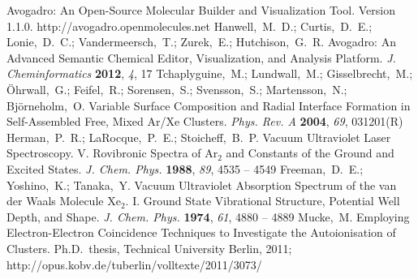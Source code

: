 \documentclass[journal=jpccck,manuscript=article]{achemso}
\begin{document}
\begin{mcitethebibliography}{73}
Avogadro: An Open-Source Molecular Builder and Visualization Tool. Version
  1.1.0. http://avogadro.openmolecules.net\relax
\mciteBstWouldAddEndPuncttrue
\mciteSetBstMidEndSepPunct{\mcitedefaultmidpunct}
{\mcitedefaultendpunct}{\mcitedefaultseppunct}\relax
\EndOfBibitem
{}
Hanwell,~M.~D.; Curtis,~D.~E.; Lonie,~D.~C.; Vandermeersch,~T.; Zurek,~E.;
  Hutchison,~G.~R. Avogadro: An Advanced Semantic Chemical Editor,
  Visualization, and Analysis Platform. \emph{J. Cheminformatics}
  \textbf{2012}, \emph{4}, 17\relax
\mciteBstWouldAddEndPuncttrue
\mciteSetBstMidEndSepPunct{\mcitedefaultmidpunct}
{\mcitedefaultendpunct}{\mcitedefaultseppunct}\relax
\EndOfBibitem
{}
Tchaplyguine,~M.; Lundwall,~M.; Gisselbrecht,~M.; \"Ohrwall,~G.; Feifel,~R.;
  Sorensen,~S.; Svensson,~S.; Martensson,~N.; Bj\"orneholm,~O. Variable Surface
  Composition and Radial Interface Formation in Self-Assembled Free, Mixed
  Ar/Xe Clusters. \emph{Phys. Rev. A} \textbf{2004}, \emph{69}, 031201(R)\relax
\mciteBstWouldAddEndPuncttrue
\mciteSetBstMidEndSepPunct{\mcitedefaultmidpunct}
{\mcitedefaultendpunct}{\mcitedefaultseppunct}\relax
\EndOfBibitem
{}
Herman,~P.~R.; LaRocque,~P.~E.; Stoicheff,~B.~P. Vacuum Ultraviolet Laser
  Spectroscopy. V. Rovibronic Spectra of Ar$_2$ and Constants of the Ground and
  Excited States. \emph{J. Chem. Phys.} \textbf{1988}, \emph{89}, 4535 --
  4549\relax
\mciteBstWouldAddEndPuncttrue
\mciteSetBstMidEndSepPunct{\mcitedefaultmidpunct}
{\mcitedefaultendpunct}{\mcitedefaultseppunct}\relax
\EndOfBibitem
{}
Freeman,~D.~E.; Yoshino,~K.; Tanaka,~Y. Vacuum Ultraviolet Absorption Spectrum
  of the van der Waals Molecule Xe$_2$. I. Ground State Vibrational Structure,
  Potential Well Depth, and Shape. \emph{J. Chem. Phys.} \textbf{1974},
  \emph{61}, 4880 -- 4889\relax
\mciteBstWouldAddEndPuncttrue
\mciteSetBstMidEndSepPunct{\mcitedefaultmidpunct}
{\mcitedefaultendpunct}{\mcitedefaultseppunct}\relax
\EndOfBibitem
{}
Mucke,~M. Employing Electron-Electron Coincidence Techniques to Investigate the
  Autoionisation of Clusters. Ph.D.\ thesis, Technical University Berlin, 2011;
  http://opus.kobv.de/tuberlin/volltexte/2011/3073/\relax

\end{mcitethebibliography}
\end{document}
